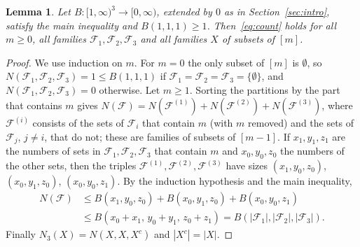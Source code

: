 \documentclass[11pt]{article}
\newtheorem{lemma}{Lemma}[section]
\theoremstyle{definition}
\numberwithin{equation}{section}
\newcommand{\cF}{\mathcal F}
\begin{document}
\begin{lemma}\label{lem:count}
Let $B\colon[1,\infty)^3\to[0,\infty)$, extended by $0$ as in Section~\ref{sec:intro}, satisfy the main inequality and
$B(1,1,1)\ge1$. Then~\eqref{eq:count} holds for all $m\ge0$, all families $\cF_1,\cF_2,\cF_3$ and all families $X$ of subsets
of $[m]$.
\end{lemma}
\begin{proof}
We use induction on $m$. For $m=0$ the only subset of $[m]$ is $\emptyset$, so $N(\cF_1,\cF_2,\cF_3)=1\le B(1,1,1)$ if
$\cF_1=\cF_2=\cF_3=\{\emptyset\}$, and $N(\cF_1,\cF_2,\cF_3)=0$ otherwise. Let $m\ge1$. Sorting the partitions by the part that
contains $m$ gives $N(\cF)=N(\cF^{(1)})+N(\cF^{(2)})+N(\cF^{(3)})$, where $\cF^{(i)}$ consists of the sets of $\cF_i$ that contain
$m$ (with $m$ removed) and the sets of $\cF_j$, $j\ne i$, that do not; these are families of subsets of $[m-1]$. If
$x_1,y_1,z_1$ are the numbers of sets in $\cF_1,\cF_2,\cF_3$ that contain $m$ and $x_0,y_0,z_0$ the numbers of the other sets,
then the triples $\cF^{(1)},\cF^{(2)},\cF^{(3)}$ have sizes $(x_1,y_0,z_0)$, $(x_0,y_1,z_0)$, $(x_0,y_0,z_1)$. By the induction
hypothesis and the main inequality,
\begin{align*}
N(\cF)&\le B(x_1,y_0,z_0)+B(x_0,y_1,z_0)+B(x_0,y_0,z_1)\\
&\le B(x_0+x_1,\,y_0+y_1,\,z_0+z_1)=B(|\cF_1|,|\cF_2|,|\cF_3|).
\end{align*}
Finally $N_3(X)=N(X,X,X^c)$ and $|X^c|=|X|$.
\end{proof}
\end{document}
